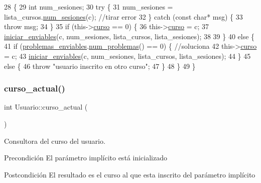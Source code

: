 \begin{DoxyCode}
28                                                                                         \{
29   \textcolor{keywordtype}{int} num\_sesiones;
30   \textcolor{keywordflow}{try} \{
31    num\_sesiones = lista\_cursos.\mbox{\hyperlink{class_cjt__curso_ad20fa025853fba4451e60e9b0cdb4011}{num\_sesiones}}(c); \textcolor{comment}{//tirar error}
32   \} \textcolor{keywordflow}{catch} (\textcolor{keyword}{const} \textcolor{keywordtype}{char}* msg) \{
33       \textcolor{keywordflow}{throw} msg;
34   \}
35   \textcolor{keywordflow}{if} (this->\mbox{\hyperlink{class_usuario_aa767fe2d1198f2c97791073bc55803e7}{curso}} == 0) \{
36     this->\mbox{\hyperlink{class_usuario_aa767fe2d1198f2c97791073bc55803e7}{curso}} = c;
37     \mbox{\hyperlink{class_usuario_a0b4c3ba568ee299aed56005ce6e6a72f}{iniciar\_enviables}}(c, num\_sesiones, lista\_cursos, lista\_sesiones);
38 
39   \}
40   \textcolor{keywordflow}{else} \{
41     \textcolor{keywordflow}{if} (\mbox{\hyperlink{class_usuario_a553cef1aad192b30d010cd524f261c1b}{problemas\_enviables}}.\mbox{\hyperlink{class_cjt__problema_acf0fca6955f991a9debb4ef50ece8905}{num\_problemas}}() == 0) \{ \textcolor{comment}{//soluciona}
42       this->\mbox{\hyperlink{class_usuario_aa767fe2d1198f2c97791073bc55803e7}{curso}} = c;
43       \mbox{\hyperlink{class_usuario_a0b4c3ba568ee299aed56005ce6e6a72f}{iniciar\_enviables}}(c, num\_sesiones, lista\_cursos, lista\_sesiones);
44     \}
45     \textcolor{keywordflow}{else} \{
46       \textcolor{keywordflow}{throw} \textcolor{stringliteral}{"usuario inscrito en otro curso"};
47     \}
48   \}
49 \}
\end{DoxyCode}
\mbox{\label{class_usuario_ad4813c66cba2cb678522cefd3491e6c0}} 
\subsubsection{\texorpdfstring{curso\+\_\+actual()}{curso\_actual()}}
{\footnotesize\ttfamily int Usuario\+::curso\+\_\+actual (\begin{DoxyParamCaption}{ }\end{DoxyParamCaption})}



Consultora del curso del usuario. 

\begin{DoxyPrecond}{Precondición}
El parámetro implícito está inicializado 
\end{DoxyPrecond}
\begin{DoxyPostcond}{Postcondición}
El resultado es el curso al que esta inscrito del parámetro implícito 
\end{DoxyPostcond}


